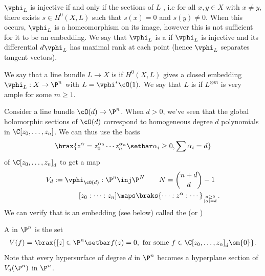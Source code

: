 \documentclass[11pt]{report}
\begin{document}
\begin{rmk}
$\vphi_L$ is injective if and only if the sections of $L$ , i.e for all $x,y \in X$ with $x\ne y$, there exists $s \in H^0(X,L)$ such that $s(x)=0$ and $s(y) \ne 0$. When this occurs, $\vphi_L$ is a homeomorphism on its image, however this is not sufficient for it to be an embedding. We say that $\vphi_L$ is a  if $\vphi_L$ is injective and its differential $d\vphi_L$ has maximal rank at each point (hence $\vphi_L$ separates tangent vectors). 
\end{rmk}

\begin{defn}
We say that a line bundle $L \to X$ is  if $H^0(X,L)$ gives a closed embedding $\vphi_L : X \to \P^n$ with $L =\vphi^* \cO(1).$ We say that $L$ is  if $L^{\otimes m}$ is very ample for some $m \ge 1$.
\end{defn}

\begin{ex}
Consider a line bundle $\cO(d)\to \P^n$. When $d>0$, we've seen that the global holomorphic sections of $\cO(d)$ correspond to homogeneous degree $d$ polynomials in $\C[z_0,\dots,z_n]$. We can thus use the basis
\begin{align*}
\brax{ z^\alpha = z_0^{\alpha_0}\cdots z_n^{\alpha_n}\setbar \alpha_i \ge 0, \sum \alpha _i=d }
\end{align*}
of $\C[z_0,\dots,z_n]_d$ to get a map
\begin{align*}
V_d := \vphi_{\cO(d)}: \P^n &\inj \P^N \qquad N = \binom{n+d}{d}-1 \\ [z_0:\cdots :z_n] & \maps \braks{\cdots : z^\alpha:\cdots }_{\alpha \ge 0 \atop |\alpha| = d}.
\end{align*}
We can verify that  is an embedding (see below) called the  (or )
\end{ex}

\begin{rmk}
A  in $\P^n$ is the set
\begin{align*}
V(f) = \brax{[z] \in \P^n \setbar f(z)=0 , \text{ for some } f \in \C[z_0,\dots,z_n]_d\sm \{0\} }.
\end{align*}
Note that every hypersurface of degree $d$ in $\P^n$ becomes a hyperplane section of $V_d(\P^n)$ in $\P^n$.

\end{rmk}
\end{document}
